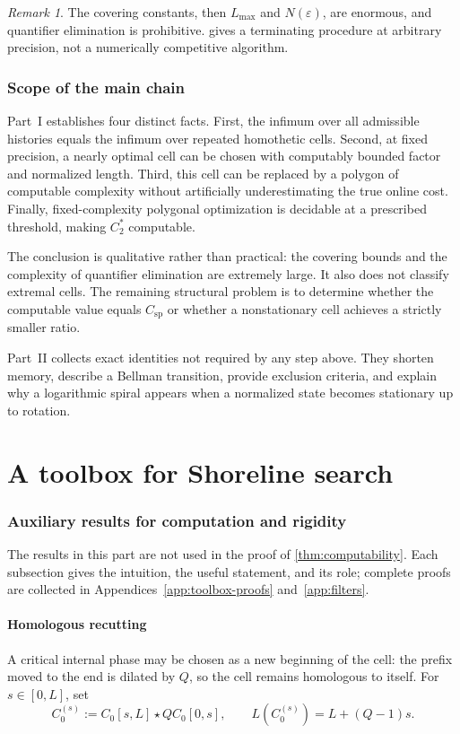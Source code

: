 \documentclass[10pt,a4paper]{article}
\theoremstyle{definition}
\theoremstyle{remark}
\newtheorem{remark}[remark]{Remark}
\newcommand{\eps}{\varepsilon}
\newcommand{\spc}{C_{\mathrm{sp}}}
\begin{document}
\begin{remark}
The covering constants, then $L_{\max}$ and $N(\eps)$, are enormous, and quantifier elimination is prohibitive.  gives a terminating procedure at arbitrary precision, not a numerically competitive algorithm.
\end{remark}

\section{Scope of the main chain}
Part~I establishes four distinct facts. First, the infimum over all admissible histories equals the infimum over repeated homothetic cells. Second, at fixed precision, a nearly optimal cell can be chosen with computably bounded factor and normalized length. Third, this cell can be replaced by a polygon of computable complexity without artificially underestimating the true online cost. Finally, fixed-complexity polygonal optimization is decidable at a prescribed threshold, making $C_2^*$ computable.

The conclusion is qualitative rather than practical: the covering bounds and the complexity of quantifier elimination are extremely large. It also does not classify extremal cells. The remaining structural problem is to determine whether the computable value equals $\spc$ or whether a nonstationary cell achieves a strictly smaller ratio.

Part~II collects exact identities not required by any step above. They shorten memory, describe a Bellman transition, provide exclusion criteria, and explain why a logarithmic spiral appears when a normalized state becomes stationary up to rotation.

\part{A toolbox for Shoreline search}

\section{Auxiliary results for computation and rigidity}
The results in this part are not used in the proof of \cref{thm:computability}. Each subsection gives the intuition, the useful statement, and its role; complete proofs are collected in Appendices~\ref{app:toolbox-proofs} and~\ref{app:filters}.

\subsection{Homologous recutting}
A critical internal phase may be chosen as a new beginning of the cell: the prefix moved to the end is dilated by $Q$, so the cell remains homologous to itself. For $s\in[0,L]$, set
\begin{equation}
C_0^{(s)}:=C_0[s,L]\star Q C_0[0,s],
\qquad
L(C_0^{(s)})=L+(Q-1)s.
\label{eq:recut-cell}
\end{equation}
\end{document}
